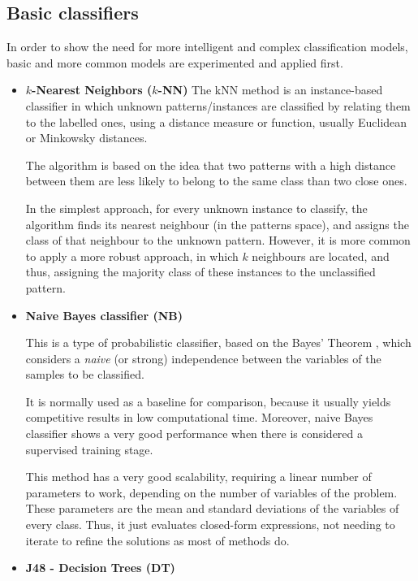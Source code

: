 \documentclass[a4paper,10pt,onecolumn,preprint,3p]{elsarticle}
\begin{document}
\subsection{Basic classifiers}
\label{subsec:classifiers}

In order to show the need for more intelligent and complex classification models, basic and more common models are experimented and applied first. 
\begin{itemize}

\item \textbf{$k$-Nearest Neighbors ($k$-NN)}
The kNN \cite{Aha1991,Mitchell1997} method is an instance-based classifier in 
which unknown patterns/instances are classified by relating them to the labelled ones, using a distance measure or function, usually Euclidean or Minkowsky distances.

The algorithm is based on the idea that two patterns with a high distance between them are less likely to belong to the same class than two close ones.

In the simplest approach, for every unknown instance to classify, the algorithm finds its nearest neighbour (in the patterns space), and assigns the class of that neighbour to the unknown pattern.
However, it is more common to apply a more robust approach, in which $k$ neighbours are located, and thus, assigning the majority class of these instances to the unclassified pattern.

\item \textbf{Naive Bayes classifier (NB)}

This is a type of probabilistic classifier, based on the Bayes' Theorem \cite{AI-book_Bayes}, which considers a \textit{naive} (or strong) independence between the variables of the samples to be classified.

It is normally used as a baseline for comparison, because it usually yields competitive results in low computational time. Moreover, naive Bayes classifier shows a very good performance when there is considered a supervised training stage.

This method has a very good scalability, requiring a linear number of parameters to work, depending on the number of variables of the problem. These parameters are the mean and standard deviations of the variables of every class.
Thus, it just evaluates closed-form expressions, not needing to iterate to refine the solutions as most of methods do.


\item \textbf{J48 - Decision Trees (DT)}


\end{itemize}
\end{document}
